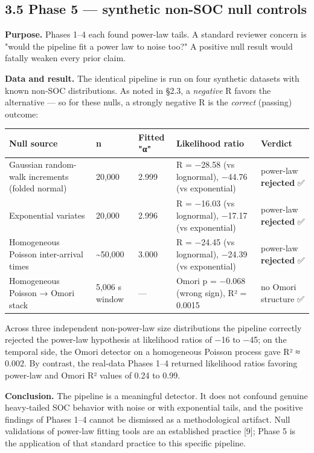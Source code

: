 \documentclass[
  11pt]{article}
\newcounter{none} %
\begin{document}
\subsection{3.5 Phase 5 --- synthetic non-SOC null
controls}\label{35-phase-5--synthetic-non-soc-null-controls}

\textbf{Purpose.} Phases 1--4 each found power-law tails. A standard
reviewer concern is "would the pipeline fit a power law to noise too?" A
positive null result would fatally weaken every prior claim.

\textbf{Data and result.} The identical pipeline is run on four
synthetic datasets with known non-SOC distributions. As noted in §2.3, a
\emph{negative} R favors the alternative --- so for these nulls, a
strongly negative R is the \emph{correct} (passing) outcome:

{\def\LTcaptype{none} %
\begin{longtable}[]{@{}lllll@{}}
\toprule\noalign{}
Null source & n & Fitted "α" & Likelihood ratio & Verdict \\
\midrule\noalign{}
\endhead
\bottomrule\noalign{}
\endlastfoot
Gaussian random-walk increments (folded normal) & 20,000 & 2.999 & R =
−28.58 (vs lognormal), −44.76 (vs exponential) & power-law
\textbf{rejected} ✅ \\
Exponential variates & 20,000 & 2.996 & R = −16.03 (vs lognormal),
−17.17 (vs exponential) & power-law \textbf{rejected} ✅ \\
Homogeneous Poisson inter-arrival times & \textasciitilde50,000 & 3.000
& R = −24.45 (vs lognormal), −24.39 (vs exponential) & power-law
\textbf{rejected} ✅ \\
Homogeneous Poisson → Omori stack & 5,006 s window & --- & Omori p =
−0.068 (wrong sign), R² = 0.0015 & no Omori structure ✅ \\
\end{longtable}
}

Across three independent non-power-law size distributions the pipeline
correctly rejected the power-law hypothesis at likelihood ratios of −16
to −45; on the temporal side, the Omori detector on a homogeneous
Poisson process gave R² ≈ 0.002. By contrast, the real-data Phases 1--4
returned likelihood ratios favoring power-law and Omori R² values of
0.24 to 0.99.

\textbf{Conclusion.} The pipeline is a meaningful detector. It does not
confound genuine heavy-tailed SOC behavior with noise or with
exponential tails, and the positive findings of Phases 1--4 cannot be
dismissed as a methodological artifact. Null validations of power-law
fitting tools are an established practice {[}9{]}; Phase 5 is the
application of that standard practice to this specific pipeline.
\end{document}
